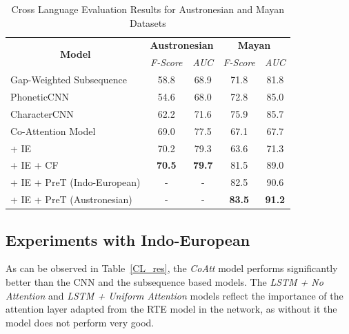 \documentclass[11pt,letterpaper]{article}
\begin{document}
\begin{table}[t]
\centering
\begin{tabular}{lcccc}
\multicolumn{1}{c}{\multirow{2}{*}{\textbf{Model}}} & \multicolumn{2}{c}{\textbf{Austronesian}} & \multicolumn{2}{c}{\textbf{Mayan}} \\ \cline{2-5} 
\multicolumn{1}{c}{}                                & \textit{F-Score}      & \textit{AUC}      & \textit{F-Score}  & \textit{AUC}   \\ \hline
Gap-Weighted Subsequence                            & 58.8                  & 68.9              & 71.8              & 81.8           \\
PhoneticCNN                                         & 54.6                  & 68.0              & 72.8              & 85.0           \\
CharacterCNN                                        & 62.2                  & 71.6              & 75.9              & 85.7           \\ \hline
Co-Attention Model                                  & 69.0                  & 77.5              & 67.1              & 67.7           \\
\quad + IE                                          & 70.2                  & 79.3              & 63.6              & 71.3           \\
\quad + IE + CF                                     & \textbf{70.5}         & \textbf{79.7}     & 81.5              & 89.0           \\
\quad + IE + PreT (Indo-European)                   & -                     & -                 & 82.5              & 90.6           \\
\quad + IE + PreT (Austronesian)                    & -                     & -                 & \textbf{83.5}     & \textbf{91.2} 
\end{tabular}
\caption{Cross Language Evaluation Results for Austronesian and Mayan Datasets }
\label{CL_res_2}
\end{table}
\subsection{Experiments with Indo-European}

As can be observed in Table~\ref{CL_res}, the \textit{CoAtt} model performs significantly better than the CNN and the subsequence based models. The \textit{LSTM + No Attention} and \textit{LSTM + Uniform Attention} models reflect the importance of the attention layer adapted from the RTE model in the network, as without it the model does not perform very good. 
\end{document}
